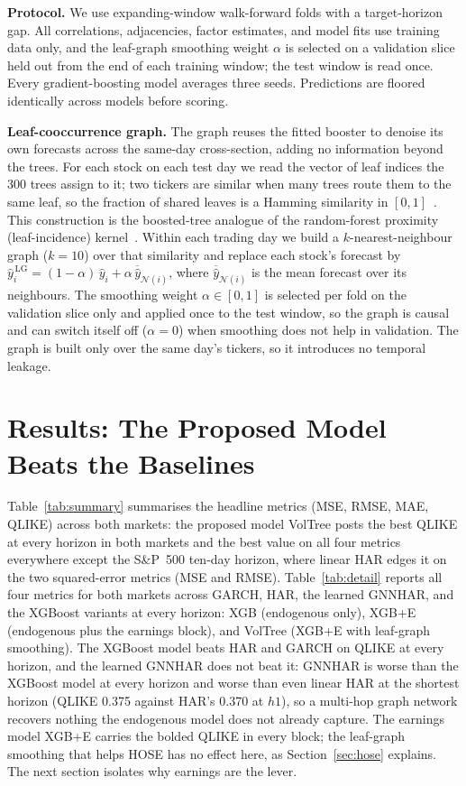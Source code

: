 \documentclass[runningheads]{llncs}
\begin{document}
\textbf{Protocol.} We use expanding-window walk-forward folds with a target-horizon gap. All
correlations, adjacencies, factor estimates, and model fits use training data only, and the leaf-graph
smoothing weight $\alpha$ is selected on a validation slice held out from the end of each training window;
the test window is read once. Every gradient-boosting model averages three seeds. Predictions are floored identically
across models before scoring.

\textbf{Leaf-cooccurrence graph.} The graph reuses the fitted booster to denoise its own
forecasts across the same-day cross-section, adding no information beyond the trees. For each stock on
each test day we read the vector of leaf indices the 300 trees assign to it; two tickers are similar
when many trees route them to the same leaf, so the fraction of shared leaves is a Hamming similarity
in $[0,1]$~\cite{chen2016}. This construction is the boosted-tree analogue of the random-forest
proximity (leaf-incidence) kernel~\cite{rhodes2023}. Within each trading day we build a $k$-nearest-neighbour
graph ($k=10$) over that similarity and replace each stock's forecast by
$\hat y_i^{\,\mathrm{LG}}=(1-\alpha)\,\hat y_i+\alpha\,\overline{\hat y}_{\mathcal{N}(i)}$, where
$\overline{\hat y}_{\mathcal{N}(i)}$ is the mean forecast over its neighbours. The smoothing weight
$\alpha\in[0,1]$ is selected per fold on the validation slice only and applied once to the test
window, so the graph is causal and can switch itself off ($\alpha=0$) when smoothing does not help in
validation. The graph is built only over the same day's tickers, so it introduces no temporal leakage.

\section{Results: The Proposed Model Beats the Baselines}\label{sec:graph}
Table~\ref{tab:summary} summarises the headline metrics (MSE, RMSE, MAE, QLIKE) across both markets: the proposed model VolTree posts the best QLIKE at every horizon in both markets and the best value on all four metrics everywhere except the S\&P~500 ten-day horizon, where linear HAR edges it on the two squared-error metrics (MSE and RMSE). Table~\ref{tab:detail} reports all four metrics for both markets across GARCH, HAR, the learned
GNNHAR, and the XGBoost variants at every horizon: XGB (endogenous only), XGB+E (endogenous plus the
earnings block), and VolTree (XGB+E with leaf-graph smoothing). The XGBoost model beats HAR
and GARCH on QLIKE at every horizon, and the learned GNNHAR does not beat it: GNNHAR is worse than the
XGBoost model at every horizon and worse than even linear HAR at the shortest horizon (QLIKE 0.375
against HAR's 0.370 at $h1$), so a multi-hop graph network recovers nothing the endogenous model does
not already capture. The earnings model XGB+E carries the bolded QLIKE in every block; the leaf-graph
smoothing that helps HOSE has no effect here, as Section~\ref{sec:hose} explains. The next section isolates
why earnings are the lever.
\end{document}
